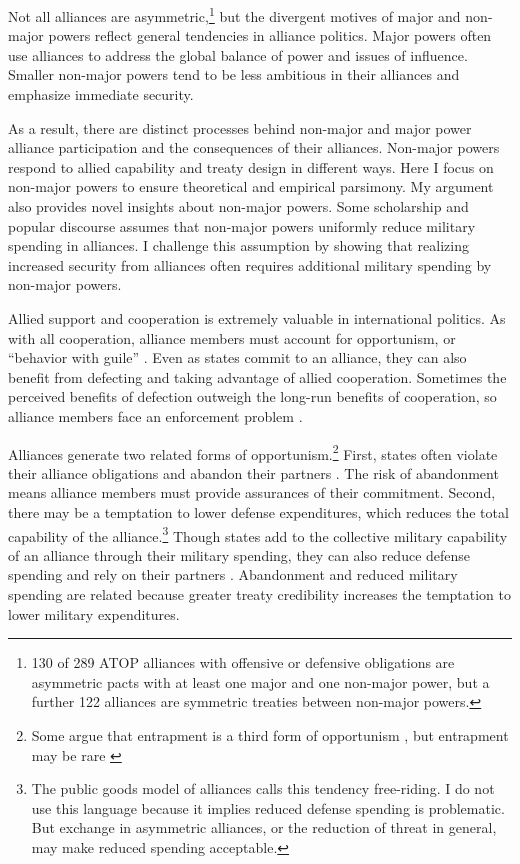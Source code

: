 \documentclass[12pt]{article}
\begin{document}
Not all alliances are asymmetric,\footnote{130 of 289 ATOP alliances with offensive or defensive obligations are asymmetric pacts with at least one major and one non-major power, but a further 122 alliances are symmetric treaties between non-major powers.} but the divergent motives of major and non-major powers reflect general tendencies in alliance politics. 
Major powers often use alliances to address the global balance of power and issues of influence. 
Smaller non-major powers tend to be less ambitious in their alliances and emphasize immediate security. 


As a result, there are distinct processes behind non-major and major power alliance participation and the consequences of their alliances. 
Non-major powers respond to allied capability and treaty design in different ways. 
Here I focus on non-major powers to ensure theoretical and empirical parsimony.
My argument also provides novel insights about non-major powers.  
Some scholarship and popular discourse assumes that non-major powers uniformly reduce military spending in alliances.
I challenge this assumption by showing that realizing increased security from alliances often requires additional military spending by non-major powers. 


Allied support and cooperation is extremely valuable in international politics. 
As with all cooperation, alliance members must account for opportunism, or ``behavior with guile'' \citep{Williamson1985}. 
Even as states commit to an alliance, they can also benefit from defecting and taking advantage of allied cooperation. 
Sometimes the perceived benefits of defection outweigh the long-run benefits of cooperation, so alliance members face an enforcement problem \citep{Fearon1998a, Koremenosetal2001}.


Alliances generate two related forms of opportunism.\footnote{Some argue that entrapment is a third form of opportunism \citep{Snyder1984}, but entrapment may be rare \citep{Kim2011, Beckley2015}}
First, states often violate their alliance obligations and abandon their partners \citep{BerkemeierFuhrmann2018}.
The risk of abandonment means alliance members must provide assurances of their commitment. 
Second, there may be a temptation to lower defense expenditures, which reduces the total capability of the alliance.\footnote{The public goods model of alliances calls this tendency free-riding. I do not use this language because it implies reduced defense spending is problematic. But exchange in asymmetric alliances, or the reduction of threat in general, may make reduced spending acceptable.}
Though states add to the collective military capability of an alliance through their military spending, they can also reduce defense spending and rely on their partners \citep{OlsonZeckhauser1966, Morrow1993, Conybeare1994, SandlerHartley2001}.
Abandonment and reduced military spending are related because greater treaty credibility increases the temptation to lower military expenditures. 
\end{document}
